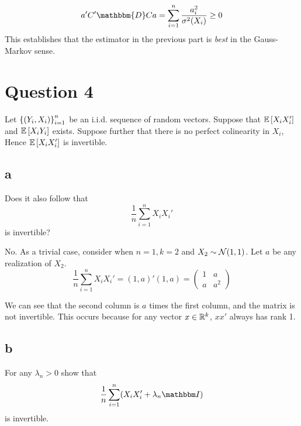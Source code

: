 \documentclass[12pt]{paper}
\begin{document}
$$a' C' \mathbbm{D} C a = \sum_{i=1}^n \frac{a_i^2}{\sigma^2(X_i)} \geq 0$$
This establishes that the estimator in the previous part is \textit{best} in the Gauss-Markov sense.

\section*{Question 4}


Let ${\left \{ (Y_i,X_i) \right \}}_{i=1}^n$ be an i.i.d. sequence of random
vectors. Suppose that $\mathbb{E} \left [ X_i X_i' \right ]$ and $\mathbb{E} \left [ X_i Y_i \right ]$
exists. Suppose further that there is no perfect colinearity in
$X_i$, Hence $\mathbb{E} \left [ X_i X_i' \right ]$ is invertible.

\subsection*{a}

Does it also follow that
\begin{equation*}
  \frac{1}{n} \sum_{i=1}^n X_i X_i'
\end{equation*} 
is invertible? \newline \newline

No. As a trivial case, consider when $n=1, k=2$ and $X_2 \sim \mathcal{N}( 1, 1
)$. Let $a$ be any realization of $X_2$.
\begin{equation*}
  \frac{1}{n} \sum_{i=1}^n X_i X_i' = (1,a)' (1,a) =
  \begin{pmatrix}
    1 & a\\ a & a^2
  \end{pmatrix}
\end{equation*}

We can see that the second column is $a$ times the first column, and
the matrix is not invertible. This occurs because for any vector $x \in
\mathbb{R}^k$, $x x'$ always has rank 1.

\subsection*{b}

For any $\lambda_n > 0$ show that
\begin{equation*}
  \frac{1}{n} \sum_{i=1}^n ( X_i X_i' + \lambda_n \eye )
\end{equation*}
is invertible. \newline \newline
\end{document}
